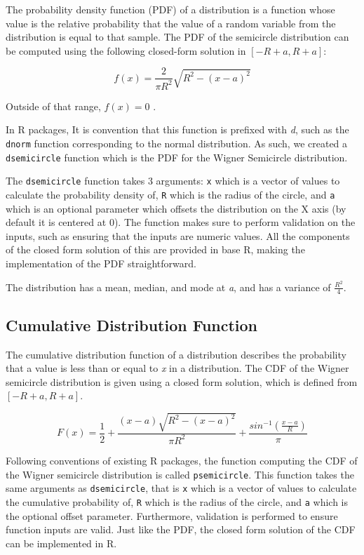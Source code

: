 \documentclass[11pt]{asaproc}
\begin{document}
The probability density function (PDF) of a distribution is a function whose
value is the relative probability that the value of a random variable from the
distribution is equal to that sample. The PDF of the semicircle distribution can
be computed using the following closed-form solution in $[-R+a, R+a]$:

\begin{equation}
  f(x) = \frac{2}{\pi R^2}\sqrt{R^2-(x-a)^2}
\end{equation}

Outside of that range, $f(x) = 0$ \citep{wikimedia_wigner}.

In R packages, It is convention that this function is prefixed with \textit{d},
such as the \texttt{dnorm} function corresponding to the normal distribution. As
such, we created a \texttt{dsemicircle} function which is the PDF for the Wigner
Semicircle distribution.

The \texttt{dsemicircle} function takes 3 arguments: \texttt{x} which is a
vector of values to calculate the probability density of, \texttt{R} which is
the radius of the circle, and \texttt{a} which is an optional parameter which
offsets the distribution on the X axis (by default it is centered at 0). The
function makes sure to perform validation on the inputs, such as ensuring that
the inputs are numeric values. All the components of the closed form solution of
this are provided in base R, making the implementation of the PDF
straightforward.

The distribution has a mean, median, and mode at \textit{a}, and has a variance of
$\frac{R^2}{4}$.


\subsection{Cumulative Distribution Function}

The cumulative distribution function of a distribution describes the probability
that a value is less than or equal to \textit{x} in a distribution. The CDF of
the Wigner semicircle distribution is given using a closed form solution, which
is defined from $[-R+a, R+a]$.

\begin{equation}
  F(x) = \frac{1}{2} + \frac{(x-a)\sqrt{R^2-(x-a)^2}}{\pi R^2} +
  \frac{sin^{-1}(\frac{x-a}{R})}{\pi}
\end{equation}

Following conventions of existing R packages, the function computing the CDF of
the Wigner semicircle distribution is called \texttt{psemicircle}. This function
takes the same arguments as \texttt{dsemicircle}, that is \texttt{x} which is a
vector of values to calculate the cumulative probability of, \texttt{R} which is
the radius of the circle, and \texttt{a} which is the optional offset parameter.
Furthermore, validation is performed to ensure function inputs are valid. Just
like the PDF, the closed form solution of the CDF can be implemented in R.
\end{document}
